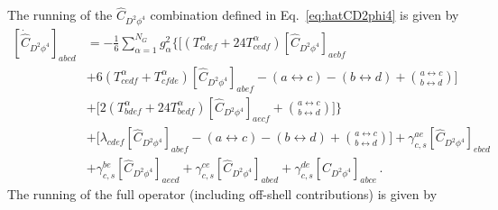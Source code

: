 The running of the $\widehat C_{D^2\phi^4}$ combination defined in Eq.~\eqref{eq:hatCD2phi4} is given by 
\begin{align}
\left[\dot{\widehat C}_{D^2\phi^4}\right]_{abcd} &=
-\frac{1}{6}\sum_{\alpha=1}^{N_G}g_\alpha^2 
\bigg\{
\bigg[
\left(T^\alpha_{cdef}+24T^\alpha_{cedf}
\right)\left[\widehat C_{D^2\phi^4}\right]_{aebf} \nonumber \\
&+ 6\left(T^\alpha_{cedf}+T^\alpha_{cfde}\right)\left[\widehat C_{D^2\phi^4}\right]_{abef} - (a\leftrightarrow c) - (b\leftrightarrow d) + 
\binom{a\leftrightarrow c}{b\leftrightarrow d}
\bigg] \nonumber \\
&+ \bigg[
2\left(T^\alpha_{bdef}+24T^\alpha_{bedf}
\right)\left[\widehat C_{D^2\phi^4}\right]_{aecf} + 
\binom{a\leftrightarrow c}{b\leftrightarrow d}
\bigg]
\bigg\}
\nonumber\\
&+ \bigg[
\lambda_{cdef}
\left[\widehat C_{D^2\phi^4}\right]_{abef}
- (a\leftrightarrow c) - (b\leftrightarrow d) + 
\binom{a\leftrightarrow c}{b\leftrightarrow d}
\bigg] +\gamma_{c,s}^{ae}\left[\widehat C_{D^2\phi^4}\right]_{ebcd}\nonumber \\
&+\gamma_{c,s}^{be}\left[\widehat C_{D^2\phi^4}\right]_{aecd}+\gamma_{c,s}^{ce}\left[\widehat C_{D^2\phi^4}\right]_{abed}+\gamma_{c,s}^{de}\left[\widehat C_{D^2\phi^4}\right]_{abce}\,.\label{eq:D2phi4<-D2phi4}
\end{align}
The running of the full operator (including off-shell contributions) is given by
